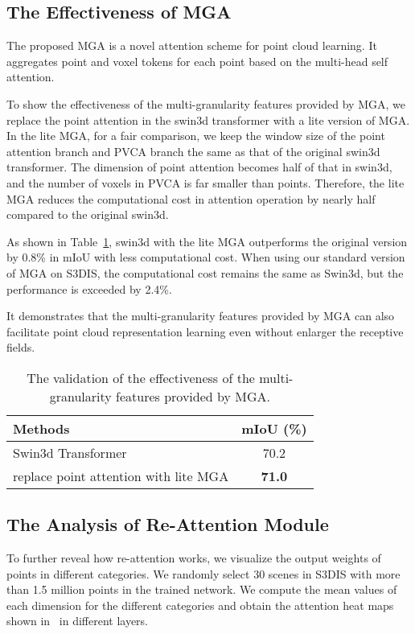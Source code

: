 \documentclass[10pt,twocolumn,letterpaper]{article}
\begin{document}
\subsection{The Effectiveness of MGA}\label{sec-4.4}
The proposed MGA is a novel attention scheme for point cloud learning. It aggregates point and voxel tokens for each point based on the multi-head self attention. 

To show the effectiveness of the multi-granularity features provided by MGA, we replace the point attention in the swin3d transformer with a lite version of MGA. In the lite MGA, for a fair comparison, we keep the window size of the point attention branch and PVCA branch the same as that of the original swin3d transformer. The dimension of point attention becomes half of that in swin3d, and the number of voxels in PVCA is far smaller than points. Therefore, the lite MGA reduces the computational cost in attention operation by nearly half compared to the original swin3d.

As shown in Table~\ref{tbl-MGA}, swin3d with the lite MGA outperforms the original version by 0.8\% in mIoU with less computational cost. When using our standard version of MGA on S3DIS, the computational cost remains the same as Swin3d, but the performance is exceeded by 2.4\%.

It demonstrates that the multi-granularity features provided by MGA can also facilitate point cloud representation learning even without enlarger the receptive fields.

\begin{table}
\begin{center}
\begin{tabular}{l|c}
\toprule
Methods                         &  mIoU (\%)                   \\ 
\midrule
Swin3d Transformer         &   70.2          \\
replace point attention with lite MGA &   \textbf{71.0}          \\
\bottomrule
\end{tabular}
\end{center}
\caption{The validation of the effectiveness of the multi-granularity features provided by MGA.}
\label{tbl-MGA}
\end{table}










\subsection{The Analysis of Re-Attention Module}\label{sec-4.5}
To further reveal how re-attention works, we visualize the output weights of points in different categories. We randomly select 30 scenes in S3DIS with more than 1.5 million points in the trained network. We compute the mean values of each dimension for the different categories and obtain the attention heat maps shown in~ in different layers. 
\end{document}
